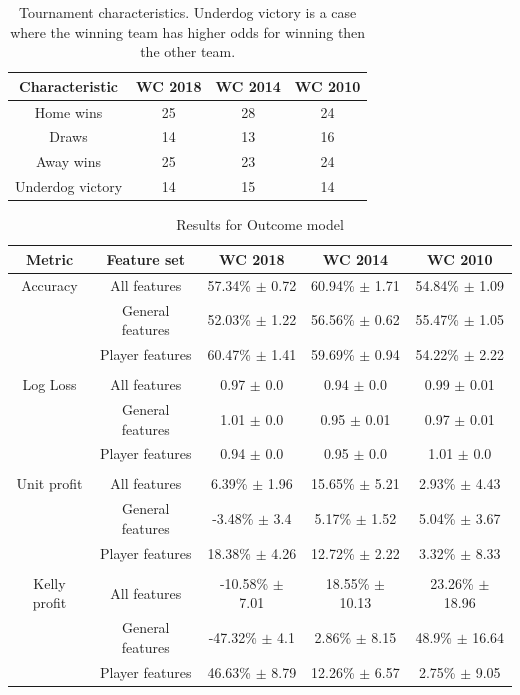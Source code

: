 \begin{table}
    \caption{Tournament characteristics. Underdog victory is a case where the winning team has higher odds for winning then the other team.}
    \begin{tabular}{| c | c|c | c|}
        \hline
        Characteristic & \textbf{WC 2018} & \textbf{WC 2014} & \textbf{WC 2010}\\
        \hline
        Home wins & 25 & 28 & 24\\
        Draws & 14 & 13 & 16\\
        Away wins & 25 & 23 & 24\\
        Underdog victory  & 14 & 15 & 14\\
        \hline
    \end{tabular}
    \label{table:tournamentcharacteristics}
\end{table}


\begin{table}
    \caption{Results for Outcome model}
    \begin{tabular}{| c  c| c| c| c|}
        \hline
        Metric& Feature set & \textbf{WC 2018} & \textbf{WC 2014} & \textbf{WC 2010}\\
        \hline
        Accuracy & All features & 57.34\% $\pm$ 0.72 & 60.94\% $\pm$ 1.71 & 54.84\% $\pm$ 1.09 \\
 & General features & 52.03\% $\pm$ 1.22 & 56.56\% $\pm$ 0.62 & 55.47\% $\pm$ 1.05 \\
 & Player features & 60.47\% $\pm$ 1.41 & 59.69\% $\pm$ 0.94 & 54.22\% $\pm$ 2.22 \\
 &  & & &  \\
Log Loss & All features & 0.97 $\pm$ 0.0 & 0.94 $\pm$ 0.0 & 0.99 $\pm$ 0.01 \\
 & General features & 1.01 $\pm$ 0.0 & 0.95 $\pm$ 0.01 & 0.97 $\pm$ 0.01 \\
 & Player features & 0.94 $\pm$ 0.0 & 0.95 $\pm$ 0.0 & 1.01 $\pm$ 0.0 \\
 &  & & &  \\
Unit profit & All features & 6.39\% $\pm$ 1.96 & 15.65\% $\pm$ 5.21 & 2.93\% $\pm$ 4.43 \\
 & General features & -3.48\% $\pm$ 3.4 & 5.17\% $\pm$ 1.52 & 5.04\% $\pm$ 3.67 \\
 & Player features & 18.38\% $\pm$ 4.26 & 12.72\% $\pm$ 2.22 & 3.32\% $\pm$ 8.33 \\
 &  & & &  \\
Kelly profit & All features & -10.58\% $\pm$ 7.01 & 18.55\% $\pm$ 10.13 & 23.26\% $\pm$ 18.96 \\
 & General features & -47.32\% $\pm$ 4.1 & 2.86\% $\pm$ 8.15 & 48.9\% $\pm$ 16.64 \\
 & Player features & 46.63\% $\pm$ 8.79 & 12.26\% $\pm$ 6.57 & 2.75\% $\pm$ 9.05 \\
 \hline
    \end{tabular}
    \label{table:outcomemodel}
\end{table}


